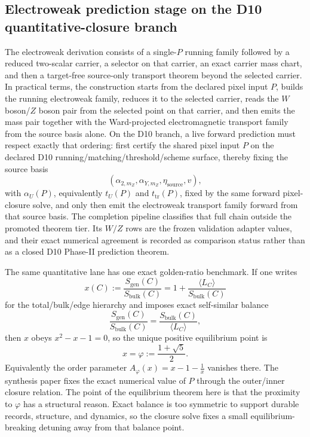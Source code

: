 \documentclass[11pt]{article}
\begin{document}
\subsection{Electroweak prediction stage on the D10 quantitative-closure branch}

The electroweak derivation consists of a single-\(P\) running family followed by a
reduced two-scalar carrier, a selector on that carrier, an exact carrier mass chart, and
then a target-free source-only transport theorem beyond the selected carrier. In practical terms, the construction starts from
the declared pixel input \(P\), builds the running electroweak family, reduces it to the selected
carrier, reads the \(W\) boson/\(Z\) boson pair from the selected point on that carrier,
and then emits the mass pair together with the Ward-projected electromagnetic transport family from
the source basis alone.
On the D10 branch, a live forward prediction must respect exactly that ordering: first certify
the shared pixel input \(P\) on the declared D10 running/matching/threshold/scheme surface, thereby fixing the source basis
\[
(\alpha_{2,m_Z},\alpha_{Y,m_Z},\eta_{\mathrm{source}},v),
\]
with \(\alpha_U(P)\), equivalently \(t_U(P)\) and \(t_{\mathrm{tr}}(P)\), fixed by the
same forward pixel-closure solve,
and only then emit the electroweak transport family forward from that source basis. The completion
pipeline classifies that full chain outside the promoted theorem tier. Its \(W/Z\) rows are the
frozen validation adapter values, and their exact numerical agreement is recorded as comparison
status rather than as a closed D10 Phase-II prediction theorem.

The same quantitative lane has one exact golden-ratio benchmark. If one writes
\[
x(C):=\frac{S_{\mathrm{gen}}(C)}{S_{\mathrm{bulk}}(C)}
=
1+\frac{\langle L_C\rangle}{S_{\mathrm{bulk}}(C)}
\]
for the total/bulk/edge hierarchy and imposes exact self-similar balance
\[
\frac{S_{\mathrm{gen}}(C)}{S_{\mathrm{bulk}}(C)}
=
\frac{S_{\mathrm{bulk}}(C)}{\langle L_C\rangle},
\]
then \(x\) obeys \(x^2-x-1=0\), so the unique positive equilibrium point is
\[
x=\varphi:=\frac{1+\sqrt5}{2}.
\]
Equivalently the order parameter \(A_\varphi(x)=x-1-\frac1x\) vanishes there. The synthesis paper
fixes the exact numerical value of \(P\) through the outer/inner closure relation. The point of
the equilibrium theorem here is that the proximity to \(\varphi\) has a structural reason. Exact
balance is too symmetric to support durable records, structure, and dynamics, so the closure solve
fixes a small
equilibrium-breaking detuning away from that balance point.
\end{document}
